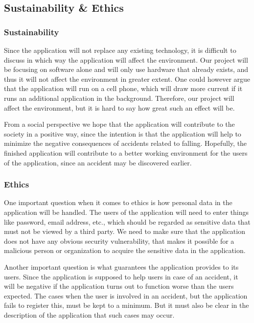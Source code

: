 \documentclass[12pt, a4paper, onecolumn]{article}
\begin{document}
		\subsection{Sustainability \& Ethics}
		
		\subsubsection{Sustainability}
		
		Since the application will not replace any existing technology, it is difficult to discuss in which way the application will affect the environment. Our project will be focusing on software alone and will only use hardware that already exists, and thus it will not affect the environment in greater extent. One could however argue that the application will run on a cell phone, which will draw more current if it runs an additional application in the background. Therefore, our project will affect the environment, but it is hard to say how great such an effect will be.
		
		From a social perspective we hope that the application will contribute to the society in a positive way, since the intention is that the application will help to minimize the negative consequences of accidents related to falling. Hopefully, the finished application will contribute to a better working environment for the users of the application, since an accident may be discovered earlier.  
		
		\subsubsection{Ethics}
		
		One important question when it comes to ethics is how personal data in the application will be handled. The users of the application will need to enter things like password, email address, etc., which should be regarded as sensitive data that must not be viewed by a third party. We need to make sure that the application does not have any obvious security vulnerability, that makes it possible for a malicious person or organization to acquire the sensitive data in the application.
		
		Another important question is what guarantees the application provides to its users. Since the application is supposed to help users in case of an accident, it will be negative if the application turns out to function worse than the users expected. The cases when the user is involved in an accident, but the application fails to register this, must be kept to a minimum. But it must also be clear in the description of the application that such cases may occur.
		
\end{document}
